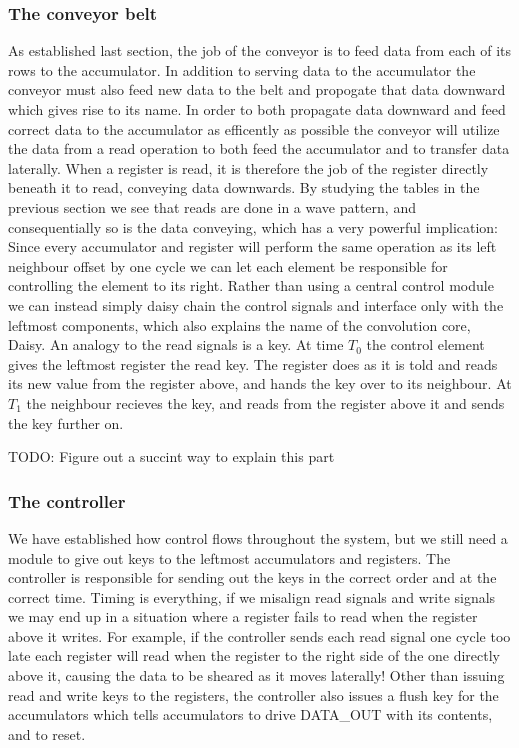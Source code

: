 \subsubsection{The conveyor belt}
As established last section, the job of the conveyor is to feed data from each of its rows to the accumulator.
In addition to serving data to the accumulator the conveyor must also feed new data to the belt and propogate that data downward which gives rise to its name.
In order to both propagate data downward and feed correct data to the accumulator as efficently as possible the conveyor will utilize the data from a read operation to both feed the accumulator and to transfer data laterally.
When a register is read, it is therefore the job of the register directly beneath it to read, conveying data downwards.
By studying the tables in the previous section we see that reads are done in a wave pattern, and consequentially so is the data conveying, which has a very powerful implication:
Since every accumulator and register will perform the same operation as its left neighbour offset by one cycle we can let each element be responsible for controlling the element to its right.
Rather than using a central control module we can instead simply daisy chain the control signals and interface only with the leftmost components, which also explains the name of the convolution core, Daisy.
An analogy to the read signals is a key. At time $T_{0}$ the control element gives the leftmost register the read key. 
The register does as it is told and reads its new value from the register above, and hands the key over to its neighbour. 
At $T_{1}$ the neighbour recieves the key, and reads from the register above it and sends the key further on.

TODO: Figure out a succint way to explain this part

\subsubsection{The controller}
We have established how control flows throughout the system, but we still need a module to give out keys to the leftmost accumulators and registers.
The controller is responsible for sending out the keys in the correct order and at the correct time.
Timing is everything, if we misalign read signals and write signals we may end up in a situation where a register fails to read when the register above it writes.
For example, if the controller sends each read signal one cycle too late each register will read when the register to the right side of the one directly above it, causing the data to be sheared as it moves laterally!
Other than issuing read and write keys to the registers, the controller also issues a flush key for the accumulators which tells accumulators to drive DATA\_OUT with its contents, and to reset.

